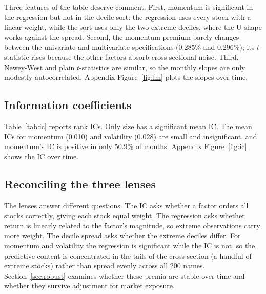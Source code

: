 \documentclass[11pt,a4paper]{article}
\newcommand{\tabfit}[1]{\resizebox{\textwidth}{!}{}}
\begin{document}
Three features of the table deserve comment. First, momentum is significant in the regression but not in the decile sort: the regression uses every stock with a linear weight, while the sort uses only the two extreme deciles, where the U-shape works against the spread. Second, the momentum premium barely changes between the univariate and multivariate specifications (0.285\% and 0.296\%); its $t$-statistic rises because the other factors absorb cross-sectional noise. Third, Newey-West and plain $t$-statistics are similar, so the monthly slopes are only modestly autocorrelated. Appendix Figure~\ref{fig:fm} plots the slopes over time.

\begin{table}[!htbp]
\centering
\caption{Fama-MacBeth regressions of monthly returns on standardised factors. $\bar\gamma$ is the mean monthly slope in \% per one cross-sectional standard deviation. Newey-West $t$-statistics (4 lags) in parentheses. Multivariate sample: 175 months, February 2012 to August 2026.}
\label{tab:fm}
\small
\tabfit{tables/fama_macbeth}
\end{table}

\subsection{Information coefficients}

Table~\ref{tab:ic} reports rank ICs. Only size has a significant mean IC. The mean ICs for momentum (0.010) and volatility (0.028) are small and insignificant, and momentum's IC is positive in only 50.9\% of months. Appendix Figure~\ref{fig:ic} shows the IC over time.

\begin{table}[!htbp]
\centering
\caption{Monthly Spearman rank information coefficients between factor values and next-month returns. Newey-West $t$ on the mean IC (4 lags).}
\label{tab:ic}
\small

\end{table}

\subsection{Reconciling the three lenses}

The lenses answer different questions. The IC asks whether a factor orders all stocks correctly, giving each stock equal weight. The regression asks whether return is linearly related to the factor's magnitude, so extreme observations carry more weight. The decile spread asks whether the extreme deciles differ. For momentum and volatility the regression is significant while the IC is not, so the predictive content is concentrated in the tails of the cross-section (a handful of extreme stocks) rather than spread evenly across all 200 names. Section~\ref{sec:robust} examines whether these premia are stable over time and whether they survive adjustment for market exposure.
\end{document}
